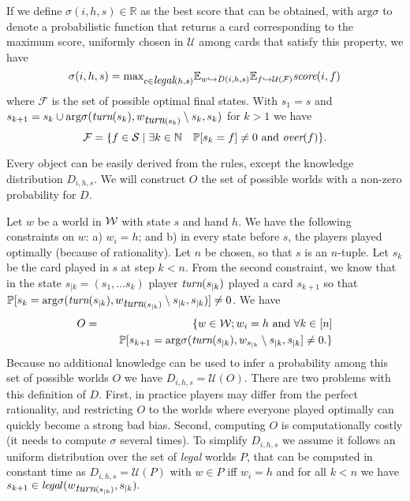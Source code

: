 \documentclass[runningheads]{llncs}
\DeclareMathOperator{\as}{\text{arg}\sigma}
\begin{document}
If we define $\sigma (i, h, s) \in \mathbb{R}$ as the best score that can be obtained, with $\text{arg}\sigma$ to denote a probabilistic function that returns a card corresponding to the maximum score, uniformly chosen in $\mathcal{U}$ among cards that satisfy this property, we have
\begin{equation*}
    \label{formalisation}
     \sigma (i, h, s) = \text{max}_{c \in \mbox{\em legal}(h,s)} \mathbb{E}_{w \hookrightarrow D(i, h, s)} \mathbb{E} _ {f \hookrightarrow \mathcal{U}(\mathcal{F})} \mbox{\em score}(i,f)
\end{equation*}
where $\mathcal{F}$ is the set of possible optimal final states.
With $s_1 = s$ and $s_{k+1} = s_k \cup \text{arg}\sigma (\mbox{\em turn}(s_k), w_{\mbox{\em turn}(s_k)} \setminus s_k, s_k)$
for $k>1$ we have
$$ \mathcal{F} = \{ f \in \mathcal{S} \mid \exists k \in \mathbb{N} \quad \mathbb{P} [s_k = f] \ne 0 \text{ and } \mbox{\em over}(f) \}. $$

Every object can be easily derived from the rules, except the knowledge distribution $D_{i,h,s}$.  
We will construct $O$ the set of possible worlds with a non-zero probability for $D$. 

Let $w$ be a world in ${\cal W}$ with state $s$ and hand $h$.  We have the following constraints on $w$: a) $w_i = h$; and b) in every state before $s$, the players played optimally (because of rationality).
Let $n$ be chosen, so that $s$ is an $n$-tuple. Let $s_k$ be the card played in $s$ at step $k < n$. From the second constraint, we know that in the state $s_{|k} = (s_1, \dots s_k)$ player $\mbox{\em turn}(s_{|k})$ played a card $s_{k+1}$ so that $\mathbb{P}[s_k = \as (\mbox{\em turn}(s_{|k}), w_{\mbox{\em turn}(s_{|k})} \setminus s_{|k}, s_{|k})] \ne 0$. We have
\begin{eqnarray*}
O &=& \{ w \in \mathcal{W}; w_i =h \text{ and } \forall k \in [n] \\ 
&& \quad \mathbb{P} [s_{k+1} = \as (\mbox{\em turn}(s_{|k}), w_{s_{|k}} \setminus s_{|k}, s_{|k}] \ne 0. \}
\end{eqnarray*}
Because no additional knowledge can be used to infer a probability among this set of possible worlds $O$ we have $D_{i,h,s} = \mathcal{U}(O)$.
%
There are two problems with this definition of $D$. First, in practice players may differ from the perfect rationality, and restricting $O$ to the worlds where everyone played optimally can quickly become a strong bad bias. Second, computing $O$ is computationally costly (it needs to compute $\sigma$ several times). %
%
To simplify $D_{i, h,s}$ we assume it follows an uniform distribution over the set of \emph{legal} worlds $P$, that can be computed in constant time as $D_{i,h,s} = \mathcal{U}(P)$ with
    $w \in P$ iff $w_i = h$ and 
   for all $k < n$ we have $s_{k+1} \in \mbox{\em lega}l(w_{\mbox{\em turn}(s_{|k})}, s_{|k}).$
\end{document}
